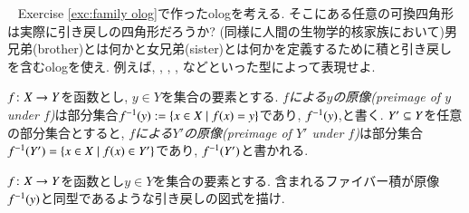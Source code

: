 \begin{exercise}~
\sexc Exercise \ref{exc:family olog}で作ったologを考える. そこにある任意の可換四角形は実際に引き戻しの四角形だろうか?
\next (同様に人間の生物学的核家族において)男兄弟(brother)とは何かと女兄弟(sister)とは何かを定義するために積と引き戻しを含むologを使え. 例えば, , , , などといった型によって表現せよ.
\endsexc
\end{exercise}

\begin{definition}[Preimage]\label{def:preimage}


$f\taking X\to Y$を函数とし, $y\in Y$を集合の要素とする. \emph{$f$による$y$の原像(preimage of $y$ under $f$)}は部分集合$f^\m1(y):=\{x\in X\|f(x)=y\}$であり, $f^\m1(y)$,と書く. $Y'\ss Y$を任意の部分集合とすると, \emph{$f$による$Y'$の原像(preimage of $Y'$ under $f$)}は部分集合$f^\m1(Y')=\{x\in X\|f(x)\in Y'\}$であり, $f^\m1(Y')$と書かれる.

\end{definition}

\begin{exercise}
$f\taking X\to Y$を函数とし$y\in Y$を集合の要素とする. 含まれるファイバー積が原像$f^\m1(y)$と同型であるような引き戻しの図式を描け.
\end{exercise}

